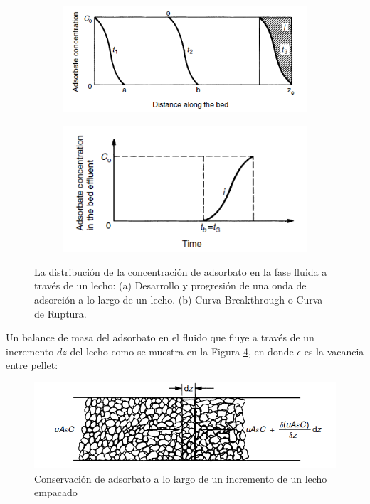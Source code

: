 \documentclass[11pt]{book}
\begin{document}
\begin{figure}[H]
  \begin{subfigure}[b]{0.45\textwidth}
    \includegraphics[width=\textwidth]{img/adsorcion/LechoEmpacado_1.PNG}
    \caption{ }
    \label{Fig:LechoEmpacado_1}
  \end{subfigure}
  \hfill
  \begin{subfigure}[b]{0.45\textwidth}
    \includegraphics[width=\textwidth]{img/adsorcion/LechoEmpacado_2.PNG}
    \caption{ }
    \label{Fig:LechoEmpacado_2}
  \end{subfigure}
  \caption{La distribución de la concentración de adsorbato en la fase fluida a través de un lecho: (a) Desarrollo y progresión de una onda de adsorción a lo largo de un lecho. (b) Curva Breakthrough o Curva de Ruptura.}
\end{figure}

Un balance de masa del adsorbato en el fluido que fluye a través de un incremento $dz$ del lecho como se muestra en la Figura \ref{Fig:LechoEmpacado_3}, en donde $\epsilon$ es la vacancia entre pellet: 

\begin{figure}[H]
    \centering
    \includegraphics[width = 12cm]{img/adsorcion/LechoEmpacado_3.PNG}
    \caption{Conservación de adsorbato a lo largo de un incremento de un lecho empacado}
    \label{Fig:LechoEmpacado_3}
\end{figure}
\end{document}
